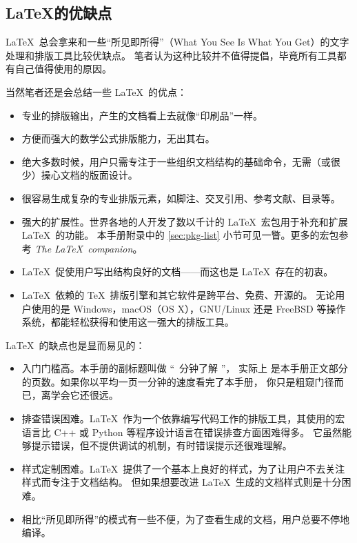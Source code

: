 \subsection{\LaTeX 的优缺点}\label{subec:advs}

\LaTeX\ 总会拿来和一些“所见即所得”（What You See Is What You Get）的文字处理和排版工具比较优缺点。
笔者认为这种比较并不值得提倡，毕竟所有工具都有自己值得使用的原因。

当然笔者还是会总结一些 \LaTeX\ 的优点：

\begin{itemize}
  \item 专业的排版输出，产生的文档看上去就像“印刷品”一样。

  \item 方便而强大的数学公式排版能力，无出其右。

  \item 绝大多数时候，用户只需专注于一些组织文档结构的基础命令，无需（或很少）操心文档的版面设计。

  \item 很容易生成复杂的专业排版元素，如脚注、交叉引用、参考文献、目录等。

  \item 强大的扩展性。世界各地的人开发了数以千计的 \LaTeX\ 宏包用于补充和扩展 \LaTeX\ 的功能。
  本手册附录中的 \ref{sec:pkg-list} 小节可见一瞥。更多的宏包参考 \textit{The \LaTeX\ companion}\cite{companion}。

  \item \LaTeX\ 促使用户写出结构良好的文档——而这也是 \LaTeX\ 存在的初衷。

  \item \LaTeX\ 依赖的 \TeX\ 排版引擎和其它软件是跨平台、免费、开源的。
  无论用户使用的是 Windows，macOS（OS X），GNU/Linux 还是 FreeBSD 等操作系统，都能轻松获得和使用这一强大的排版工具。
\end{itemize}

\LaTeX\ 的缺点也是显而易见的：
\begin{itemize}
  \item 入门门槛高。本手册的副标题叫做 “\pageref{lshort-minutes}~分钟了解 \LaTeXe ”，
  实际上 \pageref{lshort-minutes} 是本手册正文部分的页数。如果你以平均一页一分钟的速度看完了本手册，
  你只是粗窥门径而已，离学会它还很远。

  \item 排查错误困难。\LaTeX\ 作为一个依靠编写代码工作的排版工具，其使用的宏语言比 C++ 或 Python 等程序设计语言在错误排查方面困难得多。
  它虽然能够提示错误，但不提供调试的机制，有时错误提示还很难理解。

  \item 样式定制困难。\LaTeX\ 提供了一个基本上良好的样式，为了让用户不去关注样式而专注于文档结构。
  但如果想要改进 \LaTeX\ 生成的文档样式则是十分困难。

  \item 相比“所见即所得”的模式有一些不便，为了查看生成的文档，用户总要不停地编译。
\end{itemize}

